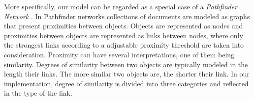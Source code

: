 More specifically, our model can be regarded as a special case of a \emph{Pathfinder Network} \cite{schvaneveldt1990pathfinder}.
In Pathfinder networks collections of documents are modeled as graphs that present proximities between objects. 
Objects are represented as nodes and proximities between objects are represented as links between nodes, where only the strongest links according to a adjustable proximity threshold are taken into consideration. Proximity can have several interpretations, one of them being similarity.
Degrees of similarity between two objects are typically modeled in the length their links. The more similar two objects are, the shorter their link.
In our implementation, degree of similarity is divided into three categories and reflected in the type of the link. 
